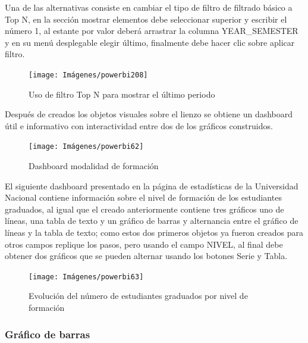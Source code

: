 \documentclass[
]{book}
\begin{document}
Una de las alternativas consiste en cambiar el tipo de filtro de filtrado básico a Top N, en la sección mostrar elementos debe seleccionar superior y escribir el número 1, al estante por valor deberá arrastrar la columna YEAR\_SEMESTER y en su menú desplegable elegir último, finalmente debe hacer clic sobre aplicar filtro.

\begin{figure}

{\centering \texttt{[image: Imágenes/powerbi208]} 

}

\caption{Uso de filtro Top N para mostrar el último periodo}\label{fig:filtrotopngraficocircular-fig}
\end{figure}

Después de creados los objetos visuales sobre el lienzo se obtiene un dashboard útil e informativo con interactividad entre dos de los gráficos construidos.

\begin{figure}

{\centering \texttt{[image: Imágenes/powerbi62]} 

}

\caption{Dashboard modalidad de formación}\label{fig:dashboardmodalidadformacion-fig}
\end{figure}

El siguiente dashboard presentado en la página de estadísticas de la Universidad Nacional contiene información sobre el nivel de formación de los estudiantes graduados, al igual que el creado anteriormente contiene tres gráficos uno de líneas, una tabla de texto y un gráfico de barras y alternancia entre el gráfico de líneas y la tabla de texto; como estos dos primeros objetos ya fueron creados para otros campos replique los pasos, pero usando el campo NIVEL, al final debe obtener dos gráficos que se pueden alternar usando los botones Serie y Tabla.

\begin{figure}

{\centering \texttt{[image: Imágenes/powerbi63]} 

}

\caption{Evolución del número de estudiantes graduados por nivel de formación}\label{fig:evolucionnivelformacion-fig}
\end{figure}

\hypertarget{gruxe1fico-de-barras}{%
\subsubsection{Gráfico de barras}\label{gruxe1fico-de-barras}}
\end{document}

